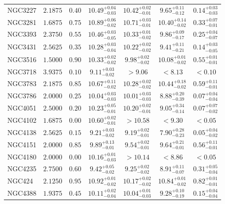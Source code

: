 \documentclass[onecolumn]{mn2e}
\begin{document}
{\begin{center}
\begin{longtable}{lcccccc}
NGC3227 & $2.1875$ & $0.40$ & $10.49_{-0.03}^{+0.04}$ & $10.42_{-0.01}^{+0.02}$ & $9.65_{-0.12}^{+0.11}$ &$0.14_{-0.03}^{+0.03}$ \\
NGC3281 & $1.6875$ & $0.75$ & $10.89_{-0.02}^{+0.06}$ & $10.71_{-0.01}^{+0.03}$ & $10.40_{-0.02}^{+0.14}$ &$0.33_{-0.01}^{+0.07}$ \\
NGC3393 & $2.3750$ & $0.55$ & $10.46_{-0.05}^{+0.03}$ & $10.33_{-0.02}^{+0.01}$ & $9.86_{-0.17}^{+0.09}$ &$0.25_{-0.07}^{+0.04}$ \\
NGC3431 & $2.5625$ & $0.35$ & $10.28_{-0.04}^{+0.03}$ & $10.22_{-0.02}^{+0.02}$ & $9.41_{-0.21}^{+0.11}$ &$0.14_{-0.05}^{+0.03}$ \\
NGC3516 & $1.5000$ & $0.90$ & $10.33_{-0.02}^{+0.02}$ & $9.98_{-0.02}^{+0.02}$ & $10.08_{-0.02}^{+0.01}$ &$0.55_{-0.01}^{+0.01}$ \\
NGC3718 & $3.9375$ & $0.10$ & $9.11_{-0.02}^{+0.03}$ & $>9.06$ & $<8.13$ &$<0.10$ \\
NGC3783 & $2.1875$ & $0.85$ & $10.67_{-0.02}^{+0.11}$ & $10.28_{-0.02}^{+0.02}$ & $10.44_{-0.02}^{+0.18}$ &$0.59_{-0.01}^{+0.11}$ \\
NGC3786 & $2.0000$ & $0.25$ & $10.04_{-0.03}^{+0.03}$ & $10.01_{-0.03}^{+0.03}$ & $8.88_{-0.39}^{+0.20}$ &$0.07_{-0.04}^{+0.04}$ \\
NGC4051 & $2.5000$ & $0.20$ & $10.23_{-0.01}^{+0.05}$ & $10.20_{-0.01}^{+0.02}$ & $9.05_{-0.14}^{+0.34}$ &$0.07_{-0.02}^{+0.07}$ \\
NGC4102 & $1.6875$ & $0.00$ & $10.60_{-0.01}^{+0.02}$ & $>10.58$ & $<9.30$ &$<0.05$ \\
NGC4138 & $2.5625$ & $0.15$ & $9.21_{-0.02}^{+0.03}$ & $9.19_{-0.01}^{+0.02}$ & $7.90_{-0.23}^{+0.28}$ &$0.05_{-0.02}^{+0.04}$ \\
NGC4151 & $2.0000$ & $0.85$ & $9.89_{-0.01}^{+0.13}$ & $9.54_{-0.01}^{+0.02}$ & $9.64_{-0.01}^{+0.21}$ &$0.56_{-0.01}^{+0.11}$ \\
NGC4180 & $2.0000$ & $0.00$ & $10.16_{-0.03}^{+0.01}$ & $>10.14$ & $<8.86$ &$<0.05$ \\
NGC4235 & $2.7500$ & $0.60$ & $9.42_{-0.02}^{+0.05}$ & $9.25_{-0.02}^{+0.02}$ & $8.91_{-0.07}^{+0.11}$ &$0.31_{-0.04}^{+0.05}$ \\
NGC424 & $2.1250$ & $0.95$ & $10.92_{-0.02}^{+0.01}$ & $10.17_{-0.02}^{+0.02}$ & $10.84_{-0.02}^{+0.01}$ &$0.82_{-0.01}^{+0.01}$ \\
NGC4388 & $1.9375$ & $0.45$ & $10.11_{-0.04}^{+0.02}$ & $10.04_{-0.03}^{+0.01}$ & $9.28_{-0.19}^{+0.10}$ &$0.15_{-0.04}^{+0.04}$ \\

\end{longtable}
\end{center}}
\end{document}
